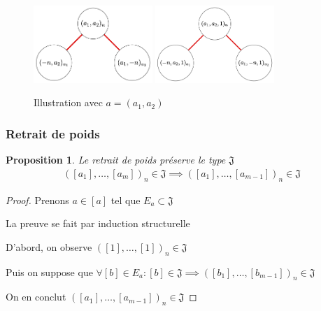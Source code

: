 \documentclass{article}
\newtheorem{proposition}{Proposition}
\newcommand{\J}{\mathfrak{J}}
\begin{document}
\begin{figure}[h]
    \caption{Illustration avec $a = (a_1, a_2)$}
    \centering
    \includegraphics[width=0.4\textwidth]{abn}
    \includegraphics[width=0.4\textwidth]{ab1n}
\end{figure}

\subsubsection{Retrait de poids}

\begin{proposition}
    Le retrait de poids préserve le type $\J$
    \begin{align*}
        {([a_1], \dots, [a_m])}_n \in \J \implies {([a_1], \dots, [a_{m-1}])}_n \in \J
    \end{align*}
\end{proposition}

\begin{proof}
    Prenons $a \in [a]$ tel que $E_a \subset \J$

    La preuve se fait par induction structurelle

    D'abord, on observe ${([1], \dots, [1])}_n \in \J$

    Puis on suppose que $\forall [b] \in E_a : [b] \in \J \implies {([b_1], \dots, [b_{m-1}])}_n \in \J$

    On en conclut ${([a_1], \dots, [a_{m-1}])}_n \in \J$

\end{proof}
\end{document}
